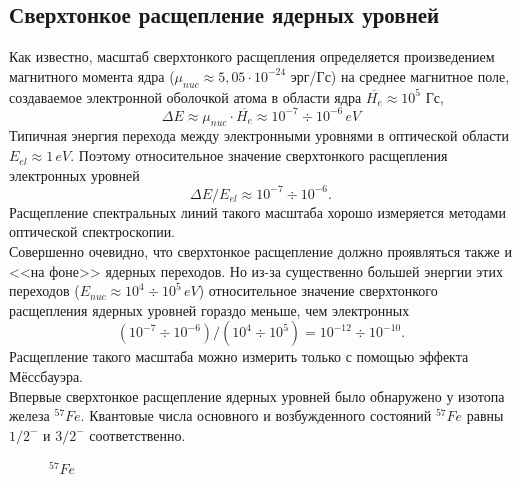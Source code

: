 \documentclass{article}
\begin{document}
\subsection{Сверхтонкое расщепление ядерных уровней}
\hspace{12pt} Как известно, масштаб сверхтонкого расщепления определяется произведением магнитного момента ядра ($\mu_{nuc} \approx 5,05 \cdot 10^{-24} $ эрг/Гс) на среднее магнитное поле, создаваемое электронной оболочкой атома в области ядра $\overline{H_e} \approx 10^5$ Гс,
$$ \Delta E \approx \mu_{nuc} \cdot \overline{H_e} \approx 10^{-7} \div 10^{-6} \hspace{2pt} eV $$
\indent Типичная энергия перехода между электронными уровнями в оптической области $E_{el} \approx 1 \hspace{2pt} eV$. Поэтому относительное значение сверхтонкого расщепления электронных уровней
$$ \Delta E/E_{el} \approx 10^{-7} \div 10^{-6}. $$
\indent Расщепление спектральных линий такого масштаба хорошо измеряется методами оптической спектроскопии.
\\
\indent Совершенно очевидно, что сверхтонкое расщепление должно проявляться также и <<на фоне>> ядерных переходов. Но из-за существенно большей энергии этих переходов ($E_{nuc} \approx 10^4 \div 10^5\hspace{2pt} eV$) относительное значение сверхтонкого расщепления ядерных уровней гораздо меньше, чем электронных 
$$ (10^{-7} \div 10^{-6})/(10^{4} \div 10^{5}) = 10^{-12} \div 10^{-10}.$$
\indent Расщепление такого масштаба можно измерить только с помощью эффекта Мёссбауэра.
\\
\indent Впервые сверхтонкое расщепление ядерных уровней было обнаружено у изотопа железа $^{57}Fe$. Квантовые числа основного и возбужденного состояний $^{57}Fe$ равны $1/2^{-}$ и $3/2^{-}$ соответственно.

\begin{figure}[h]
\caption{$^{57}Fe$}
\label{fig:image}
\end{figure}
\end{document}
